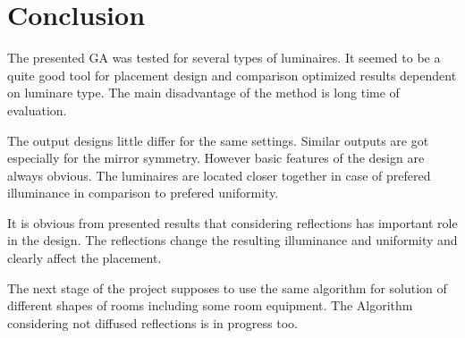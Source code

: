 \section{Conclusion}

The presented GA was tested for several types of luminaires. It seemed to be a quite good tool for placement design and comparison optimized results dependent on luminare type. The main disadvantage of the method is long time of evaluation.

The output designs little differ for the same settings. Similar outputs are got especially for the mirror symmetry. However basic features of the design are always obvious. The luminaires are located closer together in case of prefered illuminance in comparison to prefered uniformity.

It is obvious from presented results that considering reflections has important role in the design. The reflections change the resulting illuminance and uniformity and clearly affect the placement.

The next stage of the project supposes to use the same algorithm for solution of different shapes of rooms including some room equipment. The Algorithm considering not diffused reflections is in progress too.
